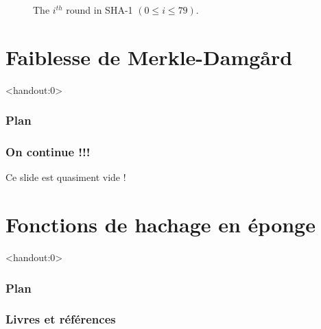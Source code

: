 \begin{frame}[fragile]
\begin{figure}[!ht]
\begin{tikzpicture}[scale=0.8]
        \end{tikzpicture}
        \caption{\label{fig:SHA-1}The $i^{th}$ round in SHA-1 $(0\le i \le 79)$.}
\end{figure}

\end{frame}
\section{Faiblesse de Merkle-Damg\r{a}rd}

\begin{frame}<handout:0>
  \frametitle{Plan}
  \tableofcontents[currentsection]
\end{frame}

\begin{frame}
  \frametitle{On continue !!!}

  \vfill
  Ce slide est quasiment vide !
  \vfill

\end{frame}


\section{Fonctions de hachage en éponge}

\begin{frame}<handout:0>
  \frametitle{Plan}
  \tableofcontents[currentsection,subsectionstyle=hide]
\end{frame}

\nocite{*}


\begin{frame}[allowframebreaks]
  \frametitle{Livres et références}
  
\end{frame}

\begin{frame}
  \vfill
  \centering
  \vfill
\end{frame}
